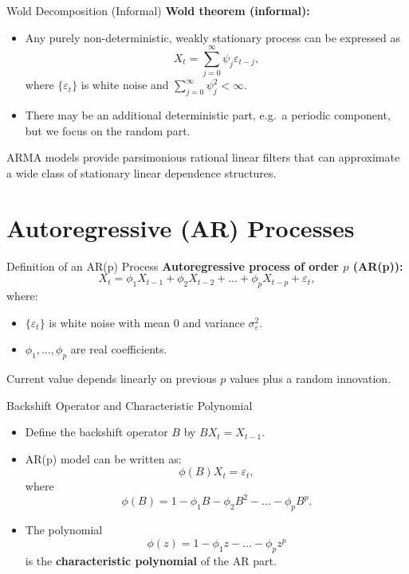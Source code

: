 \documentclass{beamer}
\begin{document}
\begin{frame}{Wold Decomposition (Informal)}
  \textbf{Wold theorem (informal):}
  \begin{itemize}
    \item Any purely non-deterministic, weakly stationary process can be expressed as
      \[
        X_t = \sum_{j=0}^{\infty} \psi_j \varepsilon_{t-j},
      \]
      where $\{\varepsilon_t\}$ is white noise and $\sum_{j=0}^{\infty} \psi_j^2 < \infty$.
    \item There may be an additional deterministic part, e.g.\ a periodic component, but we focus on the random part.
  \end{itemize}

  \vspace{0.3cm}
  ARMA models provide parsimonious rational linear filters that can approximate a wide class of stationary linear dependence structures.
\end{frame}

\section{Autoregressive (AR) Processes}

\begin{frame}{Definition of an AR(p) Process}
  \textbf{Autoregressive process of order $p$ (AR(p)):}
  \[
    X_t = \phi_1 X_{t-1} + \phi_2 X_{t-2} + \dots + \phi_p X_{t-p} + \varepsilon_t,
  \]
  where:
  \begin{itemize}
    \item $\{\varepsilon_t\}$ is white noise with mean $0$ and variance $\sigma_\varepsilon^2$.
    \item $\phi_1, \dots, \phi_p$ are real coefficients.
  \end{itemize}

  \vspace{0.3cm}
  Current value depends linearly on previous $p$ values plus a random innovation.
\end{frame}

\begin{frame}{Backshift Operator and Characteristic Polynomial}
  \begin{itemize}
    \item Define the backshift operator $B$ by $B X_t = X_{t-1}$.
    \item AR(p) model can be written as:
      \[
        \phi(B) X_t = \varepsilon_t,
      \]
      where
      \[
        \phi(B) = 1 - \phi_1 B - \phi_2 B^2 - \dots - \phi_p B^p.
      \]
    \item The polynomial
      \[
        \phi(z) = 1 - \phi_1 z - \dots - \phi_p z^p
      \]
      is the \textbf{characteristic polynomial} of the AR part.
  \end{itemize}
\end{frame}
\end{document}
